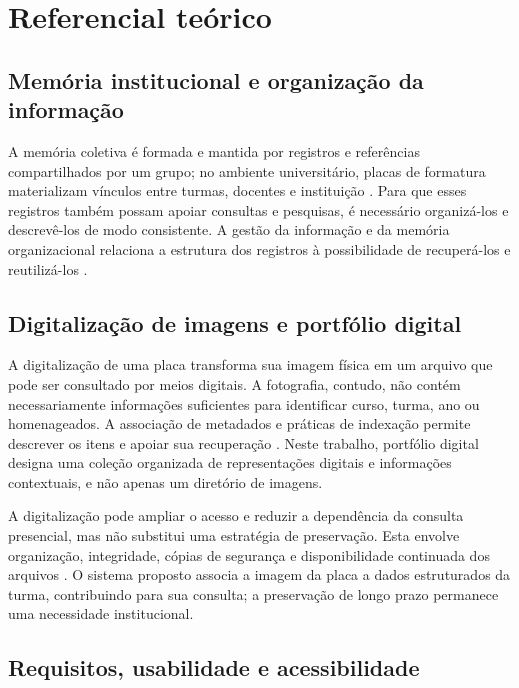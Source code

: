 \documentclass[12pt]{article}
\begin{document}
\section{Referencial teórico}

\subsection{Memória institucional e organização da informação}

A memória coletiva é formada e mantida por registros e referências
compartilhados por um grupo; no ambiente universitário, placas de formatura
materializam vínculos entre turmas, docentes e instituição \cite{halbwachs1990}.
Para que esses registros também possam apoiar consultas e pesquisas, é
necessário organizá-los e descrevê-los de modo consistente. A gestão da
informação e da memória organizacional relaciona a estrutura dos registros à
possibilidade de recuperá-los e reutilizá-los
\cite{belluzzo2011,vitorino2011,nonaka1997}.

\subsection{Digitalização de imagens e portfólio digital}

A digitalização de uma placa transforma sua imagem física em um arquivo que
pode ser consultado por meios digitais. A fotografia, contudo, não contém
necessariamente informações suficientes para identificar curso, turma, ano ou
homenageados. A associação de metadados e práticas de indexação permite
descrever os itens e apoiar sua recuperação \cite{lancaster2004}. Neste
trabalho, portfólio digital designa uma coleção organizada de representações
digitais e informações contextuais, e não apenas um diretório de imagens.

A digitalização pode ampliar o acesso e reduzir a dependência da consulta
presencial, mas não substitui uma estratégia de preservação. Esta envolve
organização, integridade, cópias de segurança e disponibilidade continuada dos
arquivos \cite{conway1996,ribeiro2018,valenti2013}. O sistema proposto associa
a imagem da placa a dados estruturados da turma, contribuindo para sua
consulta; a preservação de longo prazo permanece uma necessidade institucional.

\subsection{Requisitos, usabilidade e acessibilidade}
\end{document}
